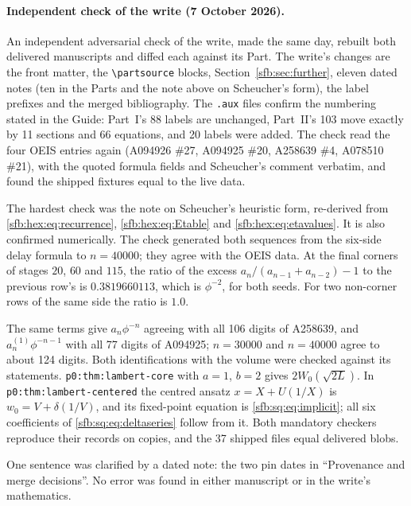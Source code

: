 \documentclass[11pt]{article}
\theoremstyle{remark}\newtheorem{remark}[theorem]{Remark}
\newcommand{\file}[1]{\nolinkurl{#1}}
\begin{document}
\paragraph{Independent check of the write (7 October 2026).} An independent
adversarial check of the write, made the same day, rebuilt both delivered
manuscripts and diffed each against its Part. The write's changes are the
front matter, the \texttt{\textbackslash partsource} blocks, Section~\ref{sfb:sec:further},
eleven dated notes (ten in the Parts and the note above on Scheucher's form),
the label prefixes and the merged bibliography. The \texttt{.aux} files
confirm the numbering stated in the Guide: Part~I's 88 labels are unchanged,
Part~II's 103 move exactly by 11 sections and 66 equations, and 20 labels
were added. The check read the four OEIS entries again (A094926 \#27,
A094925 \#20, A258639 \#4, A078510 \#21), with the quoted formula fields and
Scheucher's comment verbatim, and found the shipped fixtures equal to the
live data.

The hardest check was the note on Scheucher's heuristic form, re-derived
from \eqref{sfb:hex:eq:recurrence}, \eqref{sfb:hex:eq:Etable} and
\eqref{sfb:hex:eq:etavalues}. It is also confirmed numerically. The check
generated both sequences from the six-side delay formula to $n=40000$; they
agree with the OEIS data. At the final corners of stages $20$, $60$ and $115$,
the ratio of the excess $a_n/(a_{n-1}+a_{n-2})-1$ to the previous row's is
$0.3819660113$, which is $\phi^{-2}$, for both seeds. For two non-corner rows
of the same side the ratio is $1.0$.

The same terms give $a_n\phi^{-n}$ agreeing with all 106 digits of A258639,
and $a^{(1)}_n\phi^{-n-1}$ with all 77 digits of A094925; $n=30000$ and
$n=40000$ agree to about 124 digits. Both identifications with the volume
were checked against its statements. \file{p0:thm:lambert-core} with $a=1$,
$b=2$ gives $2W_0(\sqrt{2L})$. In \file{p0:thm:lambert-centered} the centred
ansatz $x=X+U(1/X)$ is $w_0=V+\delta(1/V)$, and its fixed-point equation is
\eqref{sfb:sq:eq:implicit}; all six coefficients of
\eqref{sfb:sq:eq:deltaseries} follow from it. Both mandatory checkers
reproduce their records on copies, and the 37 shipped files equal delivered
blobs.

One sentence was clarified by a dated note: the two pin dates in
``Provenance and merge decisions''. No error was found in either manuscript
or in the write's mathematics.
\end{document}
